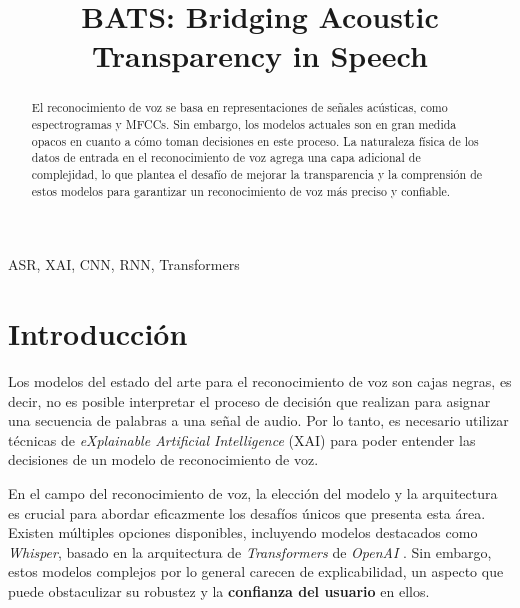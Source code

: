 \documentclass[conference]{IEEEtran}
\begin{document}
\title{BATS: Bridging Acoustic Transparency in Speech}

\author{
\and
{}
}

\maketitle

\begin{abstract}

El reconocimiento de voz se basa en representaciones de señales acústicas, como espectrogramas y MFCCs. Sin embargo, los modelos actuales son en gran medida opacos en cuanto a cómo toman decisiones en este proceso. La naturaleza física de los datos de entrada en el reconocimiento de voz agrega una capa adicional de complejidad, lo que plantea el desafío de mejorar la transparencia y la comprensión de estos modelos para garantizar un reconocimiento de voz más preciso y confiable.

\end{abstract}

\begin{IEEEkeywords}
ASR, XAI, CNN, RNN, Transformers
\end{IEEEkeywords}

\section{Introducción}

Los modelos del estado del arte para el reconocimiento de voz son cajas negras, es decir, no es posible interpretar el proceso de decisión que realizan para asignar una secuencia de palabras a una señal de audio.  Por lo tanto, es necesario utilizar técnicas de \textit{eXplainable Artificial Intelligence} (XAI) para poder entender las decisiones de un modelo de reconocimiento de voz.

En el campo del reconocimiento de voz, la elección del modelo y la arquitectura es crucial para abordar eficazmente los desafíos únicos que presenta esta área. Existen múltiples opciones disponibles, incluyendo modelos destacados como \textit{Whisper}, basado en la arquitectura de \textit{Transformers} de \textit{OpenAI} \cite{radford2022robust}. Sin embargo, estos modelos complejos por lo general carecen de explicabilidad, un aspecto que puede obstaculizar su robustez y la \textbf{confianza del usuario} en ellos.
\end{document}
